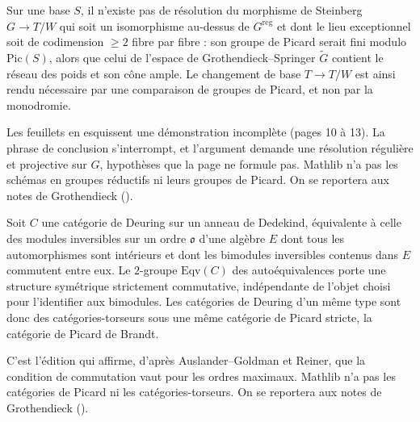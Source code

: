 \begin{encadre}
\begin{theoreme*}\nonverifie
Sur une base $S$, il n'existe pas de résolution du morphisme de Steinberg $G \to T/W$ qui soit un isomorphisme au-dessus de $G^{\mathrm{reg}}$ et dont le lieu exceptionnel soit de codimension $\geq 2$ fibre par fibre : son groupe de Picard serait fini modulo $\mathrm{Pic}(S)$, alors que celui de l'espace de Grothendieck--Springer $\tilde G$ contient le réseau des poids et son cône ample. Le changement de base $T \to T/W$ est ainsi rendu nécessaire par une comparaison de groupes de Picard, et non par la monodromie.
\end{theoreme*}
\end{encadre}
{\small Les feuillets en esquissent une démonstration incomplète (pages 10 à 13). La phrase de conclusion s'interrompt, et l'argument demande une résolution régulière et projective sur $G$, hypothèses que la page ne formule pas. Mathlib n'a pas les schémas en groupes réductifs ni leurs groupes de Picard. On se reportera aux notes de Grothendieck ().\par}

\begin{encadre}
\begin{theoreme*}\nonverifie
Soit $C$ une catégorie de Deuring sur un anneau de Dedekind, équivalente à celle des modules inversibles sur un ordre $\mathfrak o$ d'une algèbre $E$ dont tous les automorphismes sont intérieurs et dont les bimodules inversibles contenus dans $E$ commutent entre eux. Le $2$-groupe $\mathrm{Eqv}(C)$ des autoéquivalences porte une structure symétrique strictement commutative, indépendante de l'objet choisi pour l'identifier aux bimodules. Les catégories de Deuring d'un même type sont donc des catégories-torseurs sous une même catégorie de Picard stricte, la catégorie de Picard de Brandt.
\end{theoreme*}
\end{encadre}
{\small C'est l'édition qui affirme, d'après Auslander--Goldman et Reiner, que la condition de commutation vaut pour les ordres maximaux. Mathlib n'a pas les catégories de Picard ni les catégories-torseurs. On se reportera aux notes de Grothendieck ().\par}

